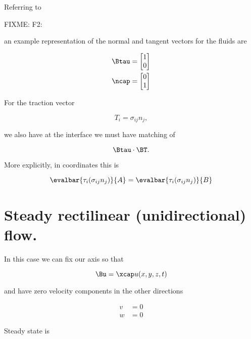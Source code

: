 Referring to 

FIXME: F2: 

an example representation of the normal and tangent vectors for the fluids are

\begin{align}\label{eqn:continuumL11:90}
\Btau &= 
\begin{bmatrix}
1 \\
0
\end{bmatrix} \\
\ncap &= 
\begin{bmatrix}
0 \\
1
\end{bmatrix} 
\end{align}

For the traction vector

\begin{equation}\label{eqn:continuumL11:110}
T_i = \sigma_{ij} n_j,
\end{equation}

we also have at the interface we must have matching of

\begin{equation}\label{eqn:continuumL11:130}
\Btau \cdot \BT.
\end{equation}

More explicitly, in coordinates this is

\begin{equation}\label{eqn:continuumL11:150}
\evalbar{\tau_i (\sigma_{ij} n_j)}{A} =
\evalbar{\tau_i (\sigma_{ij} n_j)}{B}
\end{equation}

\section{Steady rectilinear (unidirectional) flow.}

In this case we can fix our axis so that

\begin{equation}\label{eqn:continuumL11:170}
\Bu = \xcap u(x, y, z, t) 
\end{equation}

and have zero velocity components in the other directions

\begin{align}\label{eqn:continuumL11:190}
v &= 0 \\
w &= 0
\end{align}

Steady state is 

